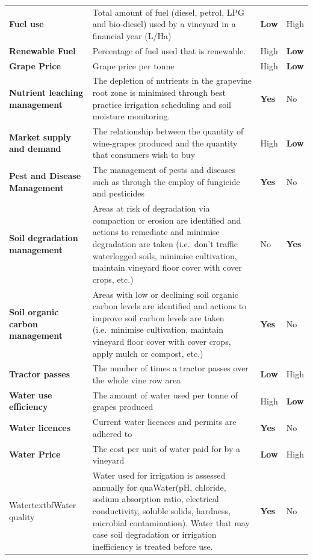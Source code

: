 \documentclass[10pt,letterpaper]{article}
\begin{document}
\begin{table}[h]
\begin{tabular}{@{}llll@{}}
    \textbf{Fuel use} & Total amount of fuel (diesel, petrol, LPG and bio-diesel) used by a vineyard in a financial year (L/Ha) & \textbf{Low} & High \\
    \textbf{Renewable Fuel} & Percentage of fuel used that is renewable. & High & \textbf{Low} \\
    \textbf{Grape Price} & Grape price per tonne & High & \textbf{Low} \\
    \textbf{Nutrient leaching management} & The depletion of nutrients in the grapevine root zone is minimised through best practice irrigation scheduling and soil moisture monitoring. & \textbf{Yes} & No \\
    \textbf{Market supply and demand} & The relationship between the quantity of wine-grapes produced and the quantity that consumers wish to buy & High & \textbf{Low} \\
    \textbf{Pest and Disease Management} & The management of pests and diseases such as through the employ of fungicide and pesticides & \textbf{Yes} & No \\
    \textbf{Soil degradation management} & Areas at risk of degradation via compaction or erosion are identified and actions to remediate and minimise degradation are taken (i.e.~don't traffic waterlogged soils, minimise cultivation, maintain vineyard floor cover with cover crops, etc.) & No & \textbf{Yes} \\
    \textbf{Soil organic carbon management} & Areas with low or declining soil organic carbon levels are identified and actions to improve soil carbon levels are taken (i.e.~minimise cultivation, maintain vineyard floor cover with cover crops, apply mulch or compost, etc.) & \textbf{Yes} & No \\
    \textbf{Tractor passes} & The number of times a tractor passes over the whole vine row area & \textbf{Low} & High \\
    \textbf{Water use efficiency} & The amount of water used per tonne of grapes produced & High & \textbf{Low} \\
    \textbf{Water licences} & Current water licences and permits are adhered to & \textbf{Yes} & No \\
    \textbf{Water Price} & The cost per unit of water paid for by a vineyard & \textbf{Low} & High \\
Watertextbf{Water quality} & Water used for irrigation is assessed annually for quaWater(pH, chloride, sodium absorption ratio, electrical conductivity, soluble solids, hardness, microbial contamination). Water that may case soil degradation or irrigation inefficiency is treated before use. & \textbf{Yes} & No \\

\end{tabular}
\end{table}
\end{document}

